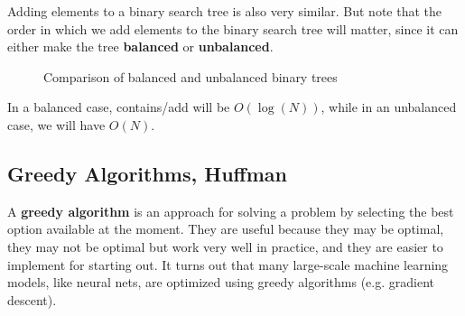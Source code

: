 \documentclass{article}
\begin{document}
      Adding elements to a binary search tree is also very similar. But note that the order in which we add elements to the binary search tree will matter, since it can either make the tree \textbf{balanced} or \textbf{unbalanced}. 
      \begin{figure}[h]
      \centering
      \caption{Comparison of balanced and unbalanced binary trees}
      \label{fig:trees}
      \end{figure}
      In a balanced case, contains/add will be $O(\log(N))$, while in an unbalanced case, we will have $O(N)$. 

  \subsection{Greedy Algorithms, Huffman}

    A \textbf{greedy algorithm} is an approach for solving a problem by selecting the best option available at the moment. They are useful because they may be optimal, they may not be optimal but work very well in practice, and they are easier to implement for starting out. It turns out that many large-scale machine learning models, like neural nets, are optimized using greedy algorithms (e.g. gradient descent). 
\end{document}
